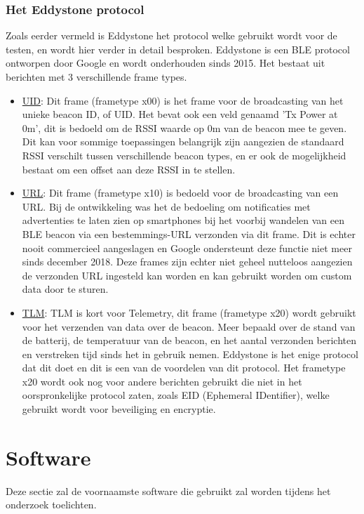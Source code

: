 \subsubsection{Het Eddystone protocol}
Zoals eerder vermeld is Eddystone het protocol welke gebruikt wordt voor de testen, en wordt hier verder in detail besproken. Eddystone is een BLE protocol ontworpen door Google en wordt onderhouden sinds 2015. Het bestaat uit berichten met 3 verschillende frame types. \autocite{Google2018}
\begin{itemize}
	\item \underline{UID}:
	Dit frame (frametype x00) is het frame voor de broadcasting van het unieke beacon ID, of UID. Het bevat ook een veld genaamd 'Tx Power at 0m', dit is bedoeld om de RSSI waarde op 0m van de beacon mee te geven. Dit kan voor sommige toepassingen belangrijk zijn aangezien de standaard RSSI verschilt tussen verschillende beacon types, en er ook de mogelijkheid bestaat om een offset aan deze RSSI in te stellen.
	\item \underline{URL}:
	Dit frame (frametype x10) is bedoeld voor de broadcasting van een URL. Bij de ontwikkeling was het de bedoeling om notificaties met advertenties te laten zien op smartphones bij het voorbij wandelen van een BLE beacon via een bestemmings-URL verzonden via dit frame. Dit is echter nooit commercieel aangeslagen en Google ondersteunt deze functie niet meer sinds december 2018.\autocite{Estimote2018} Deze frames zijn echter niet geheel nutteloos aangezien de verzonden URL ingesteld kan worden en kan gebruikt worden om custom data door te sturen.
	\item \underline{TLM}:
	TLM is kort voor Telemetry, dit frame (frametype x20) wordt gebruikt voor het verzenden van data over de beacon. Meer bepaald over de stand van de batterij, de temperatuur van de beacon, en het aantal verzonden berichten en verstreken tijd sinds het in gebruik nemen. Eddystone is het enige protocol dat dit doet en dit is een van de voordelen van dit protocol. Het frametype x20 wordt ook nog voor andere berichten gebruikt die niet in het oorspronkelijke protocol zaten, zoals EID (Ephemeral IDentifier), welke gebruikt wordt voor beveiliging en encryptie.
\end{itemize}

\section{Software}
\label{sec:lit-software}
Deze sectie zal de voornaamste software die gebruikt zal worden tijdens het onderzoek toelichten.

